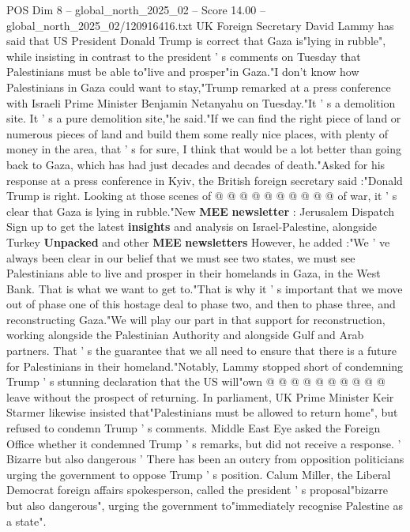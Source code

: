 \begin{textsample}{POS Dim 8 – global\_north\_2025\_02 – Score 14.00 – global\_north\_2025\_02/120916416.txt}  \label{ex:f8_pos_008}
UK Foreign Secretary David Lammy has said that US President Donald Trump is correct that Gaza is"lying in rubble", while insisting in contrast to the president ' s comments on Tuesday that Palestinians must be able to"live and prosper"in Gaza."I don't know how Palestinians in Gaza could want to stay,"Trump remarked at a press conference with Israeli Prime Minister Benjamin Netanyahu on Tuesday."It ' s a demolition site.
It ' s a pure demolition site,"he said."If we can find the right piece of land or numerous pieces of land and build them some really nice places, with plenty of money in the area, that ' s for sure, I think that would be a lot better than going back to Gaza, which has had just decades and decades of death."Asked for his response at a press conference in Kyiv, the British foreign secretary said :"Donald Trump is right.
Looking at those scenes of @ @ @ @ @ @ @ @ @ @ of war, it ' s clear that Gaza is lying in rubble."New \textbf{MEE} \textbf{newsletter} : Jerusalem Dispatch Sign up to get the latest \textbf{insights} and analysis on Israel-Palestine, alongside Turkey \textbf{Unpacked} and other \textbf{MEE} \textbf{newsletters} However, he added :"We ' ve always been clear in our belief that we must see two states, we must see Palestinians able to live and prosper in their homelands in Gaza, in the West Bank.
That is what we want to get to."That is why it ' s important that we move out of phase one of this hostage deal to phase two, and then to phase three, and reconstructing Gaza."We will play our part in that support for reconstruction, working alongside the Palestinian Authority and alongside Gulf and Arab partners.
That ' s the guarantee that we all need to ensure that there is a future for Palestinians in their homeland."Notably, Lammy stopped short of condemning Trump ' s stunning declaration that the US will"own @ @ @ @ @ @ @ @ @ @ leave without the prospect of returning.
In parliament, UK Prime Minister Keir Starmer likewise insisted that"Palestinians must be allowed to return home", but refused to condemn Trump ' s comments.
Middle East Eye asked the Foreign Office whether it condemned Trump ' s remarks, but did not receive a response. ' Bizarre but also dangerous ' There has been an outcry from opposition politicians urging the government to oppose Trump ' s position.
Calum Miller, the Liberal Democrat foreign affairs spokesperson, called the president ' s proposal"bizarre but also dangerous", urging the government to"immediately recognise Palestine as a state".

\end{textsample}
